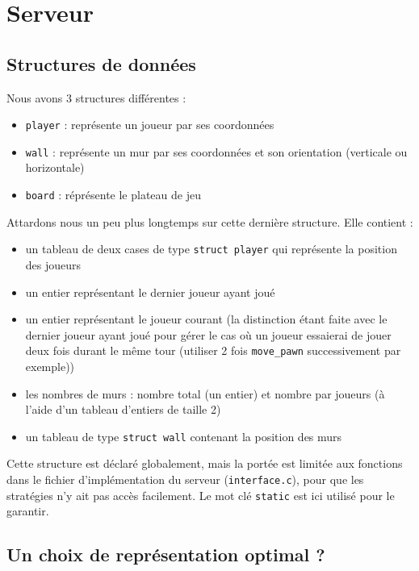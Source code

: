 \documentclass[12pt,a4paper]{article}
\begin{document}
\newpage

\section{Serveur}

\subsection{Structures de données}

Nous avons 3 structures différentes : 
\begin{itemize}
  \item \verb,player, : représente un joueur par ses coordonnées
  \item \verb,wall, : représente un mur par ses coordonnées et son orientation (verticale ou horizontale)
  \item \verb,board, : réprésente le plateau de jeu \\
\end{itemize}

Attardons nous un peu plus longtemps sur cette dernière structure. Elle
contient :

\begin{itemize}
  \item un tableau de deux cases de type \verb,struct player, qui représente la position des joueurs 
  \item un entier représentant le dernier joueur ayant joué
  \item un entier représentant le joueur courant (la distinction 
    étant faite avec le  dernier joueur ayant joué pour gérer le cas où un joueur 
    essaierai de jouer deux fois durant le même tour (utiliser 2 fois 
    \verb,move_pawn, successivement par exemple))
  \item les nombres de murs : nombre total (un entier) et nombre par joueurs (à l'aide d'un tableau d'entiers de taille 2)
  \item un tableau de type \verb,struct wall, contenant la position des murs \\
\end{itemize}

Cette structure est déclaré globalement, mais la portée est limitée aux fonctions 
dans le fichier d'implémentation du serveur (\verb,interface.c,), pour que les 
stratégies n'y ait pas accès facilement. Le mot clé \verb,static, est ici utilisé pour
le garantir.

\subsection{Un choix de représentation optimal ?}
\end{document}
